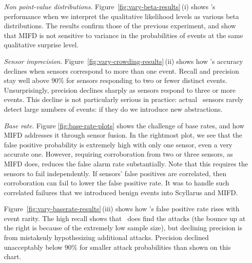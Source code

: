\emph{Non point-value distributions.}
Figure~\ref{fig:vary-beta-results}\,(i) shows \mifd's performance when we
interpret the qualitative likelihood levels as various beta
distributions.
The results confirm those of the previous experiment, and show that MIFD is not sensitive
to variance in the probabilities of events at the same qualitative surprise level.

\emph{Sensor imprecision.}
Figure~\ref{fig:vary-crowding-results}\,(ii) shows how \mifd's accuracy
declines when sensors correspond to more than one event.  
Recall and precision stay well above 90\% for sensors responding to
two or fewer distinct events. Unsurprisingly, precision declines sharply as
sensors respond to three or more events.  This decline is not
particularly serious in practice: actual \ids\ sensors rarely detect
large numbers of events: if they do we introduce new
abstractions.

\emph{Base rate.} \label{sec:base-rate}
Figure \ref{fig:base-rate-plots} shows the challenge of base rates, and how MIFD
addresses it through sensor fusion.  
In the rightmost plot, we see
that the
false positive probability is extremely high with only one sensor, even a very
accurate
one.  However, requiring corroboration from two or three sensors,
as MIFD does, reduces the false alarm rate substantially.
Note that this requires the sensors to fail independently.  If sensors'
false positives are correlated, then corroboration can fail to
lower the false positive rate.  It was
to handle such correlated failures that we introduced benign events
into Scyllarus and MIFD.


Figure~\ref{fig:vary-baserate-results}\,(iii) shows how \mifd's false
positive rate rises with event rarity. The high recall shows that
\mifd\ does find the attacks (the bounce up at the right is because of the
extremely low sample size), but declining precision is from mistakenly
hypothesizing additional attacks.  Precision declined unacceptably
below 90\% for smaller attack probabilities
than shown on this chart.


